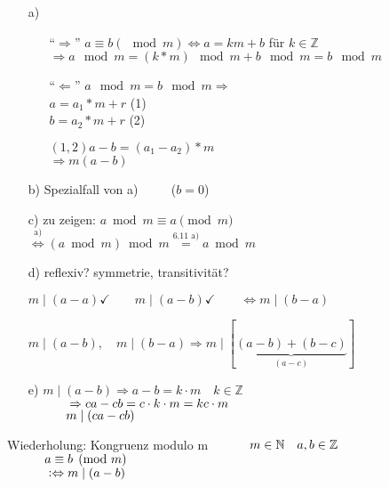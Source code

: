 \documentclass[a4paper, 12pt, twoside] {article}
\begin{document}
\begin{itemize}

\item[a)] \begin{itemize}

\item["`$\Rightarrow$"'] $ a \equiv b (\mod m) \Leftrightarrow a = k m + b$ für $k \in \mathbb{Z}$ \\
$\Rightarrow a \mod m = (k * m) \mod m + b \mod m = b \mod m$

\item["`$\Leftarrow$"'] $a \mod m = b \mod m \Rightarrow$ \\
$a = a_1 *m + r$ (1) \\
$b = a_2 *m + r$ (2) \/

$(1, 2) a -b = (a_1 - a_2) *m$ \\
$\Rightarrow m(a -b)$

\end{itemize}

\item[b)] Spezialfall von a) $\qquad$ ($b=0$)


\item[c)] zu zeigen: $a \bmod m \equiv a \pmod m$ \\
$\overset{\text{a)}}{\Leftrightarrow} (a \bmod m) \bmod m \overset{\text{6.11 a)}}{=} a \bmod m$

\item[d)] reflexiv? symmetrie, transitivität?

$m \mid (a-a) \checkmark \qquad m \mid (a-b) \checkmark \qquad \Leftrightarrow m \mid (b-a)$ 

$m \mid (a-b), \quad m \mid (b-a) \Rightarrow m \mid [\underbrace{(a-b)+(b-c)}_{(a-c)}]$

\item[e)] $m \mid (a-b) \Rightarrow a-b = k \cdot m \quad k \in \mathbb{Z}$ \\
$\text{\qquad \quad} \Rightarrow ca-cb = c \cdot k \cdot m = kc \cdot m$ \\
$\text{\qquad \quad} m \mid (ca-cb)$

\end{itemize}

Wiederholung: Kongruenz modulo m
$\text{\qquad \quad} m \in \mathbb{N} \quad a,b \in \mathbb{Z}$ \\
$\text{\qquad \quad} a \equiv b \pmod m$ \\
$\text{\qquad \quad} :\Leftrightarrow m \mid (a-b)$
\end{document}
